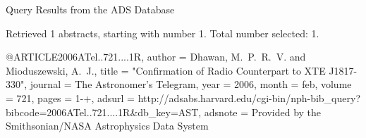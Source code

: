Query Results from the ADS Database


Retrieved 1 abstracts, starting with number 1.  Total number selected: 1.

@ARTICLE{2006ATel..721....1R,
   author = {{Dhawan}, M.~P.~R.~V. and {Mioduszewski}, A.~J.},
    title = "{Confirmation of Radio Counterpart to XTE J1817-330}",
  journal = {The Astronomer's Telegram},
     year = 2006,
    month = feb,
   volume = 721,
    pages = {1-+},
   adsurl = {http://adsabs.harvard.edu/cgi-bin/nph-bib_query?bibcode=2006ATel..721....1R&db_key=AST},
  adsnote = {Provided by the Smithsonian/NASA Astrophysics Data System}
}


